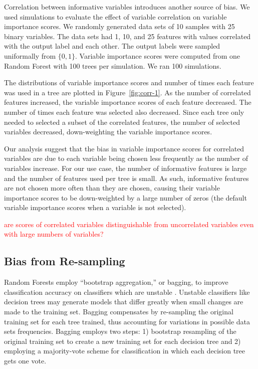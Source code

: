 Correlation between informative variables introduces another source of bias. We used simulations to evaluate the effect of variable correlation on variable importance scores. We randomly generated data sets of 10 samples with 25 binary variables.  The data sets had 1, 10, and 25 features with values correlated with the output label and each other. The output labels were sampled uniformally from $\{0, 1\}$. Variable importance scores were computed from one Random Forest with 100 trees per simulation.  We ran 100 simulations.

The distributions of variable importance scores and number of times each feature was used in a tree are plotted in Figure~\ref{fig:corr-1}.  As the number of correlated features increased, the variable importance scores of each feature decreased.  The number of times each feature was selected also decreased.  Since each tree only needed to selected a subset of the correlated features, the number of selected variables decreased, down-weighting the variable importance scores.

Our analysis suggest that the bias in variable importance scores for correlated variables are due to each variable being chosen less frequently as the number of variables increase.  For our use case, the number of informative features is large and the number of features used per tree is small.  As such, informative features are not chosen more often than they are chosen, causing their variable importance scores to be down-weighted by a large number of zeros (the default variable importance scores when a variable is not selected).

\textcolor{red}{are scores of correlated variables distinguishable from uncorrelated variables even with large numbers of variables?}

\subsection{Bias from Re-sampling} \label{sec:resampling}
Random Forests employ ``bootstrap aggregation,'' or bagging, to improve classification accuracy on classifiers which are unstable \cite{Breiman1996}.  Unstable classifiers like decision trees may generate models that differ greatly when small changes are made to the training set.  Bagging compensates by re-sampling the original training set for each tree trained, thus accounting for variations in possible data sets frequencies.  Bagging employs two steps: 1) bootstrap resampling of the original training set to create a new training set for each decision tree and 2) employing a majority-vote scheme for classification in which each decision tree gets one vote.

